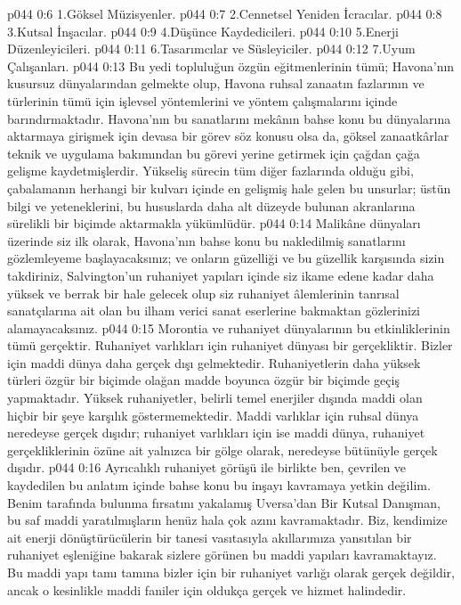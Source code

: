 \vs p044 0:6 1.\bibnobreakspace Göksel Müzisyenler.
\vs p044 0:7 2.\bibnobreakspace Cennetsel Yeniden İcracılar.
\vs p044 0:8 3.\bibnobreakspace Kutsal İnşacılar.
\vs p044 0:9 4.\bibnobreakspace Düşünce Kaydedicileri.
\vs p044 0:10 5.\bibnobreakspace Enerji Düzenleyicileri.
\vs p044 0:11 6.\bibnobreakspace Tasarımcılar ve Süsleyiciler.
\vs p044 0:12 7.\bibnobreakspace Uyum Çalışanları.
\vs p044 0:13 Bu yedi topluluğun özgün eğitmenlerinin tümü; Havona’nın kusursuz dünyalarından gelmekte olup, Havona ruhsal zanaatın fazlarının ve türlerinin tümü için işlevsel yöntemlerini ve yöntem çalışmalarını içinde barındırmaktadır. Havona’nın bu sanatlarını mekânın bahse konu bu dünyalarına aktarmaya girişmek için devasa bir görev söz konusu olsa da, göksel zanaatkârlar teknik ve uygulama bakımından bu görevi yerine getirmek için çağdan çağa gelişme kaydetmişlerdir. Yükseliş sürecin tüm diğer fazlarında olduğu gibi, çabalamanın herhangi bir kulvarı içinde en gelişmiş hale gelen bu unsurlar; üstün bilgi ve yeteneklerini, bu hususlarda daha alt düzeyde bulunan akranlarına sürelikli bir biçimde aktarmakla yükümlüdür.
\vs p044 0:14 Malikâne dünyaları üzerinde siz ilk olarak, Havona’nın bahse konu bu nakledilmiş sanatlarını gözlemleyeme başlayacaksınız; ve onların güzelliği ve bu güzellik karşısında sizin takdiriniz, Salvington’un ruhaniyet yapıları içinde siz ikame edene kadar daha yüksek ve berrak bir hale gelecek olup siz ruhaniyet âlemlerinin tanrısal sanatçılarına ait olan bu ilham verici sanat eserlerine bakmaktan gözlerinizi alamayacaksınız.
\vs p044 0:15 Morontia ve ruhaniyet dünyalarının bu etkinliklerinin tümü gerçektir. Ruhaniyet varlıkları için ruhaniyet dünyası bir gerçekliktir. Bizler için maddi dünya daha gerçek dışı gelmektedir. Ruhaniyetlerin daha yüksek türleri özgür bir biçimde olağan madde boyunca özgür bir biçimde geçiş yapmaktadır. Yüksek ruhaniyetler, belirli temel enerjiler dışında maddi olan hiçbir bir şeye karşılık göstermemektedir. Maddi varlıklar için ruhsal dünya neredeyse gerçek dışıdır; ruhaniyet varlıkları için ise maddi dünya, ruhaniyet gerçekliklerinin özüne ait yalnızca bir gölge olarak, neredeyse bütünüyle gerçek dışıdır.
\vs p044 0:16 Ayrıcalıklı ruhaniyet görüşü ile birlikte ben, çevrilen ve kaydedilen bu anlatım içinde bahse konu bu inşayı kavramaya yetkin değilim. Benim tarafında bulunma fırsatını yakalamış Uversa’dan Bir Kutsal Danışman, bu saf maddi yaratılmışların henüz hala çok azını kavramaktadır. Biz, kendimize ait enerji dönüştürücülerin bir tanesi vasıtasıyla akıllarımıza yansıtılan bir ruhaniyet eşleniğine bakarak sizlere görünen bu maddi yapıları kavramaktayız. Bu maddi yapı tamı tamına bizler için bir ruhaniyet varlığı olarak gerçek değildir, ancak o kesinlikle maddi faniler için oldukça gerçek ve hizmet halindedir.
